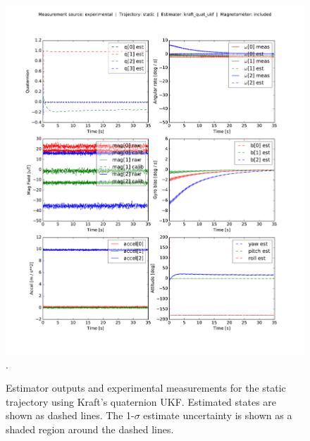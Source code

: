 \documentclass[conference]{IEEEtran}
\begin{document}
\begin{figure}[!t]
  \centering
  \includegraphics[width=7.5in]{figures/est_result_pickle_static_kraft_quat_ukf_mag.pdf}
  \DeclareGraphicsExtensions.
  \caption{Estimator outputs and experimental measurements for the static trajectory using Kraft's quaternion UKF. Estimated states are shown as dashed lines. The 1-$\sigma$ estimate uncertainty is shown as a shaded region around the dashed lines.}
  \label{fig:est_result_pickle_static_kraft_quat_ukf_mag}
\end{figure}
\end{document}

